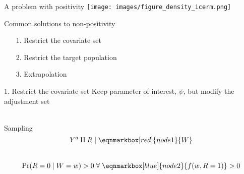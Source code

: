 \documentclass{beamer}
\begin{document}
\begin{frame}{A problem with positivity}
	\centering
	\texttt{[image: images/figure\_density\_icerm.png]}
\end{frame}

\begin{frame}{Common solutions to non-positivity}
	\begin{enumerate}
		\item[1.] Restrict the covariate set
		\item[2.] Restrict the target population
		\item[3.] Extrapolation
	\end{enumerate}
\end{frame}


\begin{frame}{1. Restrict the covariate set}
	Keep parameter of interest, $\psi$, but modify the adjustment set
	\\~\\
	\begin{block}{Sampling}
		\begin{equation*}
			Y^a \amalg R \mid \eqnmarkbox[red]{node1}{W}
		\end{equation*}
		~\\
		\begin{equation*}
			\Pr(R=0 \mid W=w) > 0 \; \forall \; 
			\eqnmarkbox[blue]{node2}{f(w,R=1)}
			> 0
		\end{equation*}
	\end{block}	
\end{frame}

\end{document}
